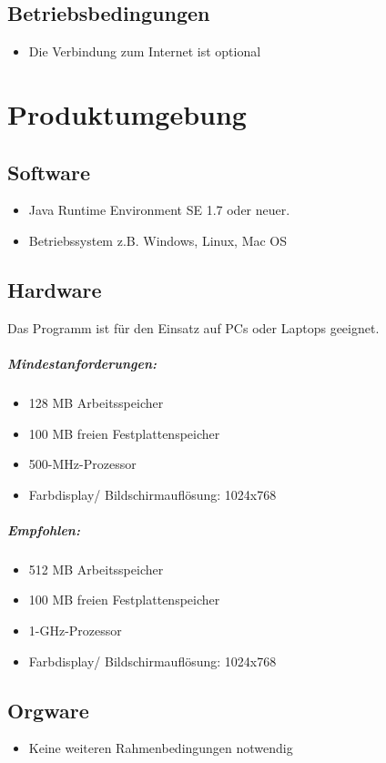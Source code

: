 \documentclass[10pt,a4paper]{article}
\begin{document}
\subsection{Betriebsbedingungen}
\begin{itemize}
\item Die Verbindung zum Internet ist optional
\end{itemize}


\section{Produktumgebung}
\subsection{Software}
\begin{itemize}
\item Java Runtime Environment SE 1.7 oder neuer.
\item Betriebssystem z.B. Windows, Linux, Mac OS
\end{itemize}


\subsection{Hardware}
Das Programm ist für den Einsatz auf PCs oder Laptops geeignet.
\subparagraph{Mindestanforderungen:}
\begin{itemize}
\item 128 MB Arbeitsspeicher
\item 100 MB freien Festplattenspeicher
\item 500-MHz-Prozessor
\item Farbdisplay/ Bildschirmauflösung: 1024x768
\end{itemize}

\subparagraph{Empfohlen:}
\begin{itemize}
\item 512 MB Arbeitsspeicher
\item 100 MB freien Festplattenspeicher
\item 1-GHz-Prozessor
\item Farbdisplay/ Bildschirmauflösung: 1024x768
\end{itemize}


\subsection{Orgware}
\begin{itemize}
\item Keine weiteren Rahmenbedingungen notwendig
\end{itemize}
\end{document}

